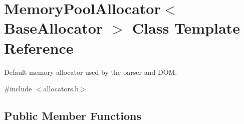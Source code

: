 \hypertarget{class_memory_pool_allocator}{}\section{Memory\+Pool\+Allocator$<$ Base\+Allocator $>$ Class Template Reference}
\label{class_memory_pool_allocator}


Default memory allocator used by the parser and D\+OM.  




{\ttfamily \#include $<$allocators.\+h$>$}

\subsection*{Public Member Functions}
